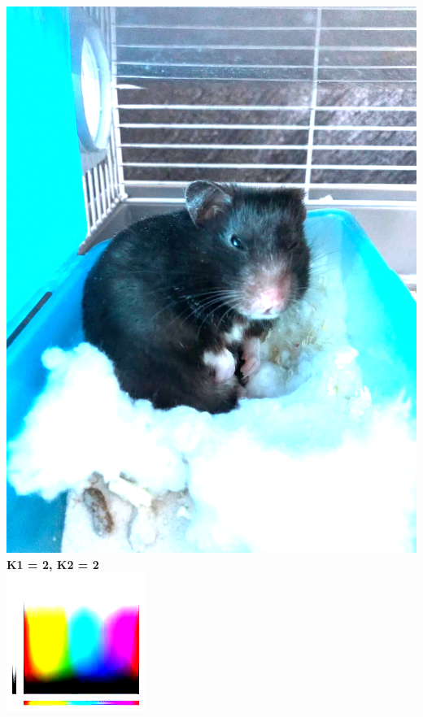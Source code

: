 \documentclass{article}
\begin{document}
\includegraphics[totalheight = 4cm]{321.png} \\
{\bf K1 = 2, K2 = 2\/}\\
\includegraphics[totalheight = 4cm]{122.png} \hspace{1.5cm}
\end{document}
